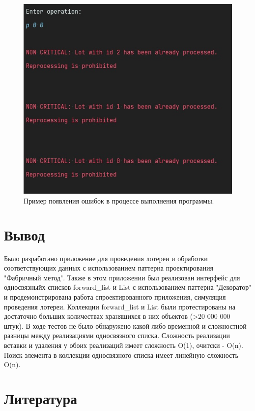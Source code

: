 \documentclass[a4paper,14pt]{article}
\begin{document}
\begin{figure}[H]
  \centering
  \captionsetup{justification=centering,margin=1cm}
  \includegraphics{pictures/11}
  \caption{Пример появления ошибок в процессе выполнения программы.}
\end{figure}
\clearpage

\section{Вывод}
Было разработано приложение для проведения лотереи и обработки соответствующих данных с использованием паттерна проектирования "Фабричный метод". Также в этом приложении был реализован интерфейс для односвязныйх списков forward\_list и List с использованием паттерна "Декоратор" и продемонстрирована работа спроектированного приложения, симуляция проведения лотереи.
Коллекции forward\_list и List были протестированы на достаточно больших количествах хранящихся в них объектов (>20 000 000 штук). В ходе тестов не было обнаружено какой-либо временной и сложностной разницы между реализациями односвязного списка. Сложность реализации вставки и удаления у обоих реализаций имеет сложность O(1), очитски - O(n). Поиск элемента в коллекции односвязного списка имеет линейную сложность O(n).
\newpage

\section{Литература}
\end{document}
